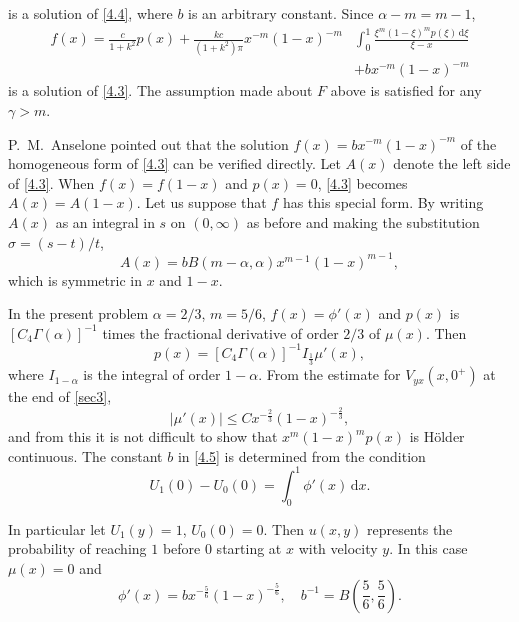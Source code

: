 \documentclass[leqno]{article}
\numberwithin{equation}{section}
\theoremstyle{plain}
\newcommand{\dd}{\,\mathrm{d}}
\begin{document}
is a solution of \eqref{4.4}, where $b$ is an arbitrary constant. 
Since $\alpha-m=m-1$,
\begin{equation}
	\label{4.5}
	\begin{split}
		f(x)=\frac{c}{1+k^{2}} p(x)+\frac{k c}{(1+k^{2}) \pi} x^{-m}(1-x)^{-m} &\int_{0}^{1} \frac{\xi^{m}(1-\xi)^{m} p(\xi) \dd\xi}{\xi-x} \\
		&+b x^{-m}(1 - x)^{-m}
	\end{split}
\end{equation}
is a solution of \eqref{4.3}.
The assumption made about $F$ above is satisfied for any $\gamma > m$.

P.\ M.\ Anselone pointed out that the solution $f(x) = b x^{-m} (1-x)^{-m}$ of the homogeneous form of \eqref{4.3} can be verified directly.
Let $A(x)$ denote the left side of \eqref{4.3}.
When $f(x) = f(1-x)$ and $p(x)=0$, \eqref{4.3} becomes $A(x) = A(1-x)$.
Let us suppose that $f$ has this special form.
By writing $A(x)$ as an integral in $s$ on $(0,\infty)$ as before and making the substitution $\sigma = (s-t)/t$,
\begin{equation*}
	A(x) = b B(m-\alpha,\alpha) x^{m-1}(1-x)^{m-1},
\end{equation*}
which is symmetric in $x$ and $1-x$.

In the present problem $\alpha = 2/3$, $m = 5/6$, $f(x) = \phi'(x)$ and $p(x)$ is $[C_4 \Gamma(\alpha)]^{-1}$ times the fractional derivative of order $2/3$ of $\mu(x)$.
Then
\begin{equation*}
	p(x) = [C_4 \Gamma(\alpha)]^{-1} I_{\frac 1 3} \mu'(x),
\end{equation*}
where $I_{1-\alpha}$ is the integral of order $1-\alpha$.
From the estimate for $V_{yx}(x,0^+)$ at the end of \cref{sec3},
\begin{equation*}
	|\mu'(x)| \leq C x^{-\frac 23} (1-x)^{-\frac 23},
\end{equation*}
and from this it is not difficult to show that $x^m (1-x)^m p(x)$ is Hölder continuous.
The constant $b$ in \eqref{4.5} is determined from the condition 
\begin{equation*}
	U_1(0)-U_0(0) = \int_0^1 \phi'(x) \dd x.
\end{equation*}

In particular let $U_1(y) = 1$, $U_0(0) = 0$.
Then $u(x,y)$ represents the probability of reaching $1$ before $0$ starting at $x$ with velocity $y$.
In this case $\mu(x) = 0$ and
\begin{equation*}
	\phi'(x) = b x^{-\frac 56} (1-x)^{-\frac 56},
	\quad 
	b^{-1} = B\left(\frac56,\frac56\right).
\end{equation*}
\end{document}
